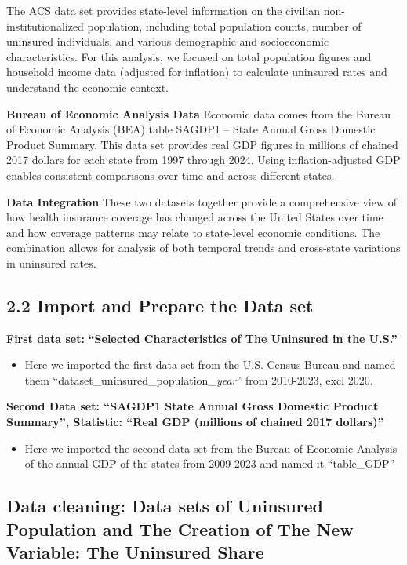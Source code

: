 \documentclass[
]{article}
\providecommand{\tightlist}{%
  \setlength{\itemsep}{0pt}\setlength{\parskip}{0pt}}
\begin{document}
The ACS data set provides state-level information on the civilian
non-institutionalized population, including total population counts,
number of uninsured individuals, and various demographic and
socioeconomic characteristics. For this analysis, we focused on total
population figures and household income data (adjusted for inflation) to
calculate uninsured rates and understand the economic context.

\textbf{Bureau of Economic Analysis Data} Economic data comes from the
Bureau of Economic Analysis (BEA) table SAGDP1 -- State Annual Gross
Domestic Product Summary. This data set provides real GDP figures in
millions of chained 2017 dollars for each state from 1997 through 2024.
Using inflation-adjusted GDP enables consistent comparisons over time
and across different states.

\textbf{Data Integration} These two datasets together provide a
comprehensive view of how health insurance coverage has changed across
the United States over time and how coverage patterns may relate to
state-level economic conditions. The combination allows for analysis of
both temporal trends and cross-state variations in uninsured rates.

\subsection{2.2 Import and Prepare the Data
set}\label{import-and-prepare-the-data-set}

\textbf{First data set:} \textbf{``Selected Characteristics of The
Uninsured in the U.S.''}

\begin{itemize}
\tightlist
\item
  Here we imported the first data set from the U.S. Census Bureau and
  named them ``dataset\_uninsured\_population\_\emph{year''} from
  2010-2023, excl 2020.
\end{itemize}

\textbf{Second Data set: ``SAGDP1 State Annual Gross Domestic Product
Summary'', Statistic: ``Real GDP (millions of chained 2017 dollars)''}

\begin{itemize}
\tightlist
\item
  Here we imported the second data set from the Bureau of Economic
  Analysis of the annual GDP of the states from 2009-2023 and named it
  ``table\_GDP''
\end{itemize}

\subsection{Data cleaning: Data sets of Uninsured Population and The
Creation of The New Variable: The Uninsured
Share}\label{data-cleaning-data-sets-of-uninsured-population-and-the-creation-of-the-new-variable-the-uninsured-share}
\end{document}
